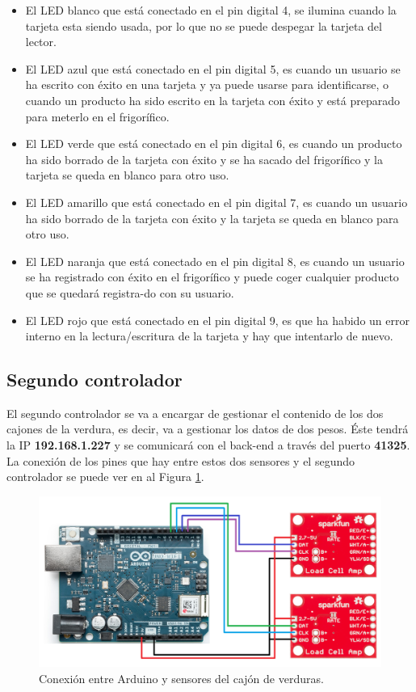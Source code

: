 \begin{itemize}
    \item El LED blanco que está conectado en el pin digital 4, se ilumina cuando la tarjeta esta siendo usada, por lo que no se puede despegar la tarjeta del lector.
    \item El LED azul que está conectado en el pin digital 5, es cuando un usuario se ha escrito con éxito en una tarjeta y ya puede usarse para identificarse, o cuando un producto ha sido escrito en la tarjeta con éxito y está preparado para meterlo en el frigorífico.
    \item El LED verde que está conectado en el pin digital 6, es cuando un producto ha sido borrado de la tarjeta con éxito y se ha sacado del frigorífico y la tarjeta se queda en blanco para otro uso. 
    \item El LED amarillo que está conectado en el pin digital 7, es cuando un usuario ha sido borrado de la tarjeta con éxito y la tarjeta se queda en blanco para otro uso.
    \item El LED naranja que está conectado en el pin digital 8, es cuando un usuario se ha registrado con éxito en el frigorífico y puede coger cualquier producto que se quedará registra-do con su usuario.
    \item El LED rojo que está conectado en el pin digital 9, es que ha habido un error interno en la lectura/escritura de la tarjeta y hay que intentarlo de nuevo.
\end{itemize}

\subsection{Segundo controlador}

El segundo controlador se va a encargar de gestionar el contenido de los dos cajones de la verdura, es decir, va a gestionar los datos de dos pesos. Éste tendrá la IP \textbf{192.168.1.227} y se comunicará con el back-end a través del puerto \textbf{41325}. La conexión de los pines que hay entre estos dos sensores y el segundo controlador se puede ver en al Figura \ref{fig:ard2}.

\begin{figure}[h] 
    \centering
    \includegraphics[width=.60\textwidth]{capitulos/capitulo6/ard2.png}
    \caption{Conexión entre Arduino y sensores del cajón de verduras.}
    \label{fig:ard2}
\end{figure}

